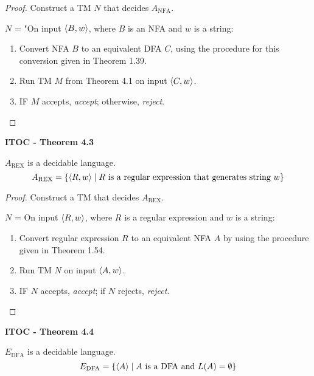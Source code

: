 \begin{mdframed}
\begin{proof}
Construct a TM $N$ that decides $A_\text{NFA}$.

\medskip
$N$ = "On input $\langle{B, w}\rangle$, where $B$ is an NFA and $w$ is a string:
\begin{enumerate}
\item Convert NFA $B$ to an equivalent DFA $C$, using the procedure for this conversion given in Theorem 1.39.
\item Run TM $M$ from Theorem 4.1 on input $\langle{C, w}\rangle$.
\item IF $M$ accepts, \textit{accept}; otherwise, \textit{reject}.
\end{enumerate}
\end{proof}
\end{mdframed}

\label{lang:AREX_DCDB}
\begin{shaded}
\textbf{ITOC - Theorem 4.3}

\medskip
$A_\text{REX}$ is a decidable language.
\[
A_\text{REX} = \{\langle{R, w}\rangle \mid R \text{ is a regular expression that generates string } w \}
\]
\end{shaded}

\begin{mdframed}
\begin{proof}
Construct a TM that decides $A_\text{REX}$.

\medskip
$N$ = On input $\langle{R, w}\rangle$, where $R$ is a regular expression and $w$ is a string:
\begin{enumerate}
\item Convert regular expression $R$ to an equivalent NFA $A$ by using the procedure given in Theorem 1.54.
\item Run TM $N$ on input $\langle{A, w}\rangle$.
\item IF $N$ accepts, \textit{accept}; if $N$ rejects, \textit{reject}.
\end{enumerate}
\end{proof}
\end{mdframed}

\label{lang:EDFA_DCDB}
\begin{shaded}
\textbf{ITOC - Theorem 4.4}

\medskip
$E_\text{DFA}$ is a decidable language.
\[
E_\text{DFA} = \{\langle{A}\rangle \mid A \text{ is a DFA and } L(A) = \emptyset \}
\]
\end{shaded}

